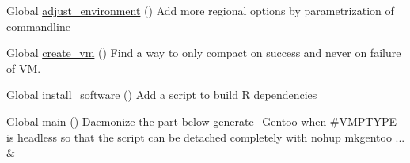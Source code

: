 
\begin{DoxyRefList}
\item[Global \mbox{\hyperlink{group__mk_file_system_gaa8c398850ee5921a441408b92f32d477}{adjust\+\_\+environment}} ()]\label{todo__todo000003}%
%
Add more regional options by parametrization of commandline  
\item[Global \mbox{\hyperlink{group__create_installer_ga629c1830d8dbae377193387edd199399}{create\+\_\+vm}} ()]\label{todo__todo000001}%
%
Find a way to only compact on success and never on failure of VM.  
\item[Global \mbox{\hyperlink{group__mk_file_system_gab693423f511d21225dbc60b2782190c3}{install\+\_\+software}} ()]\label{todo__todo000004}%
%
Add a script to build R dependencies  
\item[Global \mbox{\hyperlink{group__create_installer_ga51af30a60f9f02777c6396b8247e356f}{main}} ()]\label{todo__todo000002}%
%
Daemonize the part below generate\+\_\+\+Gentoo when \#\+V\+M\+P\+T\+Y\+PE is {\ttfamily headless} so that the script can be detached completely with {\ttfamily nohup mkgentoo ... \&} 
\end{DoxyRefList}